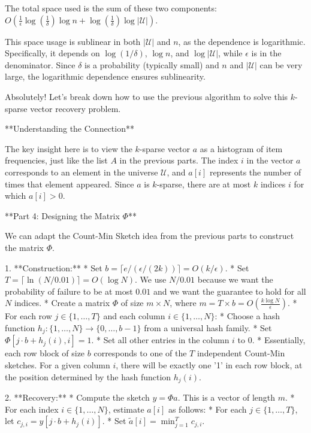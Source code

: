 \begin{enumerate}
\begin{shaded}
The total space used is the sum of these two components:
$O\left(\frac{1}{\epsilon} \log\left(\frac{1}{\delta}\right) \log n + \log\left(\frac{1}{\delta}\right) \log|\mathcal{U}|\right)$.

This space usage is sublinear in both $|\mathcal{U}|$ and $n$, as the dependence is logarithmic. Specifically, it depends on $\log(1/\delta)$, $\log n$, and $\log|\mathcal{U}|$, while $\epsilon$ is in the denominator. Since $\delta$ is a probability (typically small) and $n$ and $|\mathcal{U}|$ can be very large, the logarithmic dependence ensures sublinearity.

Absolutely! Let's break down how to use the previous algorithm to solve this $k$-sparse vector recovery problem.

**Understanding the Connection**

The key insight here is to view the $k$-sparse vector $a$ as a histogram of item frequencies, just like the list $A$ in the previous parts. The index $i$ in the vector $a$ corresponds to an element in the universe $\mathcal{U}$, and $a[i]$ represents the number of times that element appeared. Since $a$ is $k$-sparse, there are at most $k$ indices $i$ for which $a[i] > 0$.

**Part 4: Designing the Matrix $\Phi$**

We can adapt the Count-Min Sketch idea from the previous parts to construct the matrix $\Phi$.

1.  **Construction:**
    * Set $b = \lceil e / (\epsilon / (2k)) \rceil = O(k/\epsilon)$.
    * Set $T = \lceil \ln(N / 0.01) \rceil = O(\log N)$. We use $N/0.01$ because we want the probability of failure to be at most $0.01$ and we want the guarantee to hold for all $N$ indices.
    * Create a matrix $\Phi$ of size $m \times N$, where $m = T \times b = O\left(\frac{k \log N}{\epsilon}\right)$.
    * For each row $j \in \{1, \ldots, T\}$ and each column $i \in \{1, \ldots, N\}$:
        * Choose a hash function $h_j: \{1, \ldots, N\} \to \{0, \ldots, b - 1\}$ from a universal hash family.
        * Set $\Phi[j \cdot b + h_j(i), i] = 1$.
        * Set all other entries in the column $i$ to 0.
    * Essentially, each row block of size $b$ corresponds to one of the $T$ independent Count-Min sketches. For a given column $i$, there will be exactly one '1' in each row block, at the position determined by the hash function $h_j(i)$.

2.  **Recovery:**
    * Compute the sketch $y = \Phi a$. This is a vector of length $m$.
    * For each index $i \in \{1, \ldots, N\}$, estimate $a[i]$ as follows:
        * For each $j \in \{1, \ldots, T\}$, let $c_{j,i} = y[j \cdot b + h_j(i)]$.
        * Set $\tilde{a}[i] = \min_{j=1}^T c_{j,i}$.


\end{shaded}
\end{enumerate}

